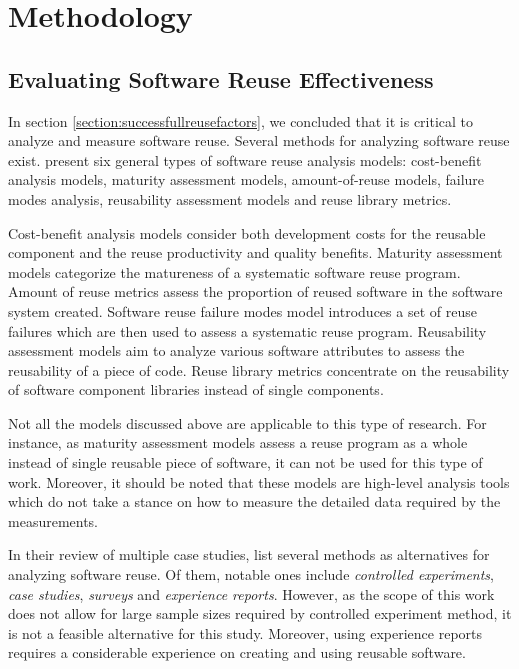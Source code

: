 
\chapter{Methodology}
\label{chapter:methods}

\section{Evaluating Software Reuse Effectiveness}

In section \ref{section:successfullreusefactors}, we concluded that it is critical to analyze and measure software reuse. Several methods for analyzing software reuse exist. \citet{frakes_software_1996} present six general types of software reuse analysis models: cost-benefit analysis models, maturity assessment models, amount-of-reuse models, failure modes analysis, reusability assessment models and reuse library metrics. 

Cost-benefit analysis models consider both development costs for the reusable component and the reuse productivity and quality benefits. Maturity assessment models categorize the matureness of a systematic software reuse program. Amount of reuse metrics assess the proportion of reused software in the software system created. Software reuse failure modes model introduces a set of reuse failures which are then used to assess a systematic reuse program. Reusability assessment models aim to analyze various software attributes to assess the reusability of a piece of code. Reuse library metrics concentrate on the reusability of software component libraries instead of single components.

Not all the models discussed above are applicable to this type of research. For instance, as maturity assessment models assess a reuse program as a whole instead of single reusable piece of software, it can not be used for this type of work. Moreover, it should be noted that these models are high-level analysis tools which do not take a stance on how to measure the detailed data required by the measurements.

In their review of multiple case studies, \citet{mohagheghi_quality_2007} list several methods as alternatives for analyzing software reuse. Of them, notable ones include \emph{controlled experiments}, \emph{case studies}, \emph{surveys} and \emph{experience reports}. However, as the scope of this work does not allow for large sample sizes required by controlled experiment method, it is not a feasible alternative for this study. Moreover, using experience reports requires a considerable experience on creating and using reusable software.

